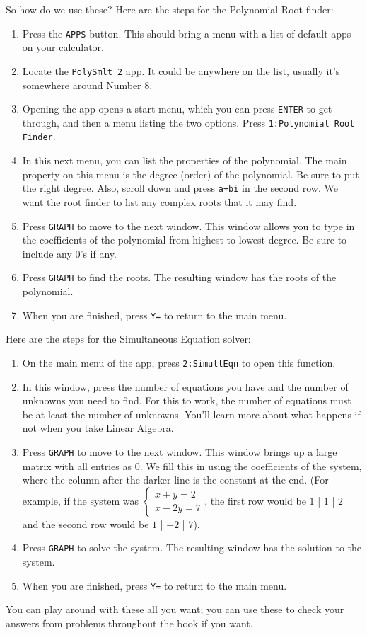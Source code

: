\documentclass[../book.tex]{subfiles}
\begin{document}
So how do we use these?  Here are the steps for the Polynomial Root finder:\begin{enumerate}
    \item Press the \texttt{APPS} button.  This should bring a menu with a list of default apps on your calculator.
    \item Locate the \texttt{PolySmlt 2} app.  It could be anywhere on the list, usually it's somewhere around Number 8.
    \item Opening the app opens a start menu, which you can press \texttt{ENTER} to get through, and then a menu listing the two options.  Press \texttt{1:Polynomial Root Finder}.
    \item In this next menu, you can list the properties of the polynomial.  The main property on this menu is the degree (order) of the polynomial. Be sure to put the right degree.  Also, scroll down and press \texttt{a+bi} in the second row.  We want the root finder to list any complex roots that it may find.
    \item Press \texttt{GRAPH} to move to the next window.  This window allows you to type in the coefficients of the polynomial from highest to lowest degree.  Be sure to include any $0$'s if any.
    \item Press \texttt{GRAPH} to find the roots.  The resulting window has the roots of the polynomial.
    \item When you are finished, press \texttt{Y=} to return to the main menu.
\end{enumerate}
Here are the steps for the Simultaneous Equation solver: \begin{enumerate}
    \item On the main menu of the app, press \texttt{2:SimultEqn} to open this function.
    \item In this window, press the number of equations you have and the number of unknowns you need to find.  For this to work, the number of equations must be at least the number of unknowns.  You'll learn more about what happens if not when you take Linear Algebra.
    \item Press \texttt{GRAPH} to move to the next window.  This window brings up a large matrix with all entries as $0$.  We fill this in using the coefficients of the system, where the column after the darker line is the constant at the end.  (For example, if the system was $\begin{cases} x+y=2 \\ x-2y=7\end{cases}$, the first row would be $1$ | $1$ | $2$ and the second row would be $1$ | $-2$ | $7$).
    \item Press \texttt{GRAPH} to solve the system. The resulting window has the solution to the system.
    \item When you are finished, press \texttt{Y=} to return to the main menu.
\end{enumerate}
You can play around with these all you want; you can use these to check your answers from problems throughout the book if you want.
\end{document}
